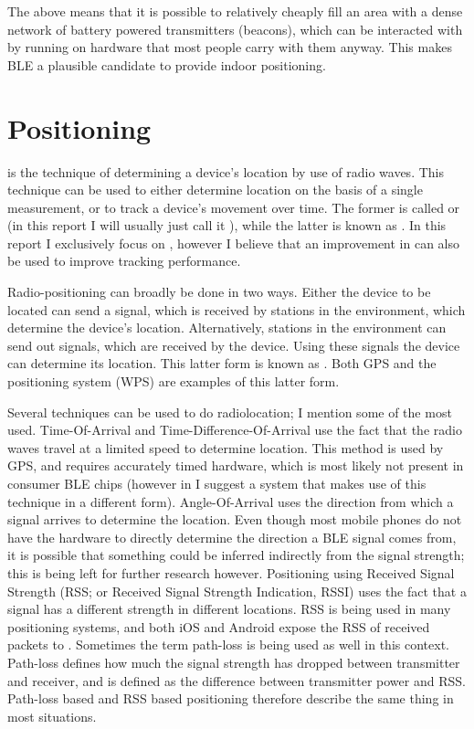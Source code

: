 The above means that it is possible to relatively cheaply fill an area with a dense network of battery powered \BLE transmitters (beacons), which can be interacted with by \apps running on hardware that most people carry with them anyway.
This makes BLE a plausible candidate to provide indoor positioning.

\section{Positioning}
 is the technique of determining a device's location by use of radio waves.
This technique can be used to either determine location on the basis of a single measurement, or to track a device's movement over time.
The former is called  or  (in this report I will usually just call it ), while the latter is known as .
In this report I exclusively focus on \ptfp, however I believe that an improvement in \ptfp can also be used to improve tracking performance.

Radio-positioning can broadly be done in two ways.
Either the device to be located can send a signal, which is received by stations in the environment, which determine the device's location.
Alternatively, stations in the environment can send out signals, which are received by the device.
Using these signals the device can determine its location.
This latter form is known as .
Both GPS and the \wifi positioning system (WPS) are examples of this latter form.

Several techniques can be used to do radiolocation; I mention some of the most used.
Time-Of-Arrival and Time-Difference-Of-Arrival use the fact that the radio waves travel at a limited speed to determine location.
This method is used by GPS, and requires accurately timed hardware, which is most likely not present in consumer BLE chips (however in  I suggest a system that makes use of this technique in a different form).
Angle-Of-Arrival uses the direction from which a signal arrives to determine the location.
Even though most mobile phones do not have the hardware to directly determine the direction a BLE signal comes from, it is possible that something could be inferred indirectly from the signal strength; this is being left for further research however.
Positioning using Received Signal Strength (RSS; or Received Signal Strength Indication, RSSI) uses the fact that a signal has a different strength in different locations.
RSS is being used in many \wifi positioning systems, and both iOS and Android expose the RSS of received packets to \apps.
Sometimes the term path-loss is being used as well in this context.
Path-loss defines how much the signal strength has dropped between transmitter and receiver, and is defined as the difference between transmitter power and RSS.
Path-loss based and RSS based positioning therefore describe the same thing in most situations.

